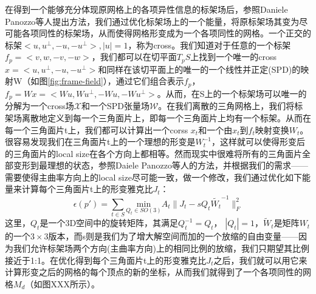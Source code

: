 在得到一个能够充分体现原网格上的各项异性信息的标架场后，参照Daniele Panozzo等人提出方法\cite{frame-field-warping}，我们通过优化标架场上的一个能量，将原标架场其变为尽可能各项同性的标架场，从而使得网格形变成为一个各项同性的网格。一个正交的标架$< u, u^\bot , −u, −u^\bot >, |u| = 1$，称为cross。我们知道对于任意的一个标架$f_p = <v, w, −v, −w >$，我们都可以在切平面$T_p S$上找到一个唯一的cross $x =<u, u^\bot , −u, −u^\bot >$和同样在该切平面上的唯一的一个线性并正定(SPD)的映射W（如图\ref{fig:frame-field}），通过它们组合表示$f_p$，$f_p = Wx = <Wu, Wu^\bot, -Wu, -Wu^\bot>$。从而，在S上的一个标架场可以唯一的分解为一个cross场$\mathcal{X}$和一个SPD张量场$\mathcal{W}$。在我们离散的三角网格上，我们将标架场离散地定义到每一个三角面片上，即每一个三角面片上均有一个标架。从而在每一个三角面片t上，我们都可以计算出一个corss $x_t$和一个由$x_t$到$f_t$映射变换$W_t$。很容易发现我们在三角面片t上的一个理想的形变是$W_t^{−1}$，这样就可以使得形变后的三角面片的local size在各个方向上都相等。然而现实中很难将所有的三角面片全部变形到最理想的状态，参照Daiele Panozzo等人的方法\cite{frame-field-warping}，并根据我们的需求——需要使得主曲率方向上的local size尽可能一致，做一个修改，我们通过优化如下能量来计算每个三角面片t上的形变雅克比$J_t$：
\begin{equation}
  \epsilon(p') = \sum_{t\in S} \underset{Q_t \in SO(3)}{\text{min}} A_t \lVert J_t - sQ_t \widetilde{W_t}^{-1} \rVert_F^2
\end{equation}
这里，$Q_t$是一个3D空间中的旋转矩阵，其满足$Q_t^{-1} = Q_t$， $|Q_t| = 1$，$\widetilde{W}_t$是矩阵$W_t$的一个$3 \times 3$版本，而s则是我们为了增大解空间而加的一个放缩的自由变量——因为我们允许标架场两个方向(主曲率方向)上的相同比例的放缩，我们只期望其比例接近于1:1。在优化得到每个三角面片t上的形变雅克比$J_t$之后，我们就可以用它来计算形变之后的网格的每个顶点的新的坐标，从而我们就得到了一个各项同性的网格$M_d$（如图XXX所示）。

